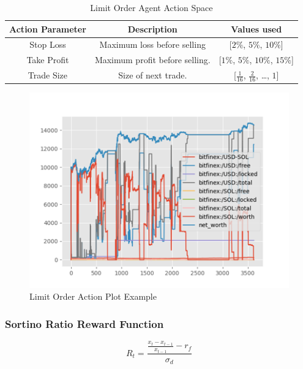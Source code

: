 \documentclass[journal]{new-aiaa}
\begin{document}
\begin{table}[hbt!]
        \centering
        \begin{tabular}{||c|c|c||}
                \hline
                \textbf{Action Parameter} & \textbf{Description} & \textbf{Values used} \\
                \hline
                \hline
                Stop Loss & Maximum loss before selling & [$2\%$, $5\%$, $10\%$] \\
                \hline
                Take Profit & Maximum profit before selling. & [$1\%$, $5\%$, $10\%$, $15\%$] \\
                \hline
                Trade Size & Size of next trade. & [$\frac{1}{16}$, $\frac{2}{16}$, \dots, $1$]\\
                \hline
        \end{tabular}
        \caption{Limit Order Agent Action Space}
        \label{tab:Limit_Order_Agent_Action_Space}
\end{table}

\begin{figure}[hbt!]
        \centering
        \includegraphics[width=.6\textwidth]{figures/Risk_action_example.png}
        \caption{Limit Order Action Plot Example}
        \label{fig:Limit Order Action Plot Example}
\end{figure}

\subsubsection{Sortino Ratio Reward Function}\label{sec:Model_Design:Managed_Risk_Agent:Sortino_Ratio_Reward_Function}

\cite{sortino1994performance}

\begin{equation}\label{eq:Sortino_Ratio_Reward_Function}
        R_t = \frac{\frac{x_{t} - x_{t-1}}{x_{t-1}} - r_f}{\sigma_d}
\end{equation}
\end{document}
